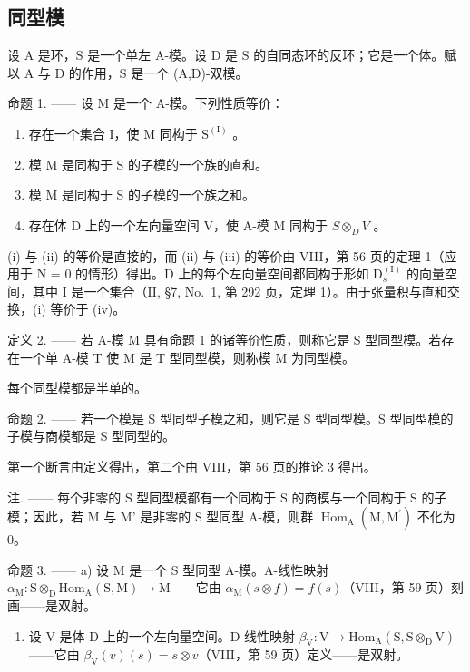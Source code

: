 \subsection{同型模}

设 A 是环，S 是一个单左 A-模。设 D 是 S 的自同态环的反环；它是一个体。赋以 A 与 D 的作用，S 是一个 (A,D)-双模。

命题 1. —— 设 M 是一个 A-模。下列性质等价：

\begin{enumerate}
\def\labelenumi{(\roman{enumi})}
\item
  存在一个集合 I，使 M 同构于 \(\mathrm{S}^{(\mathrm{I})}\) 。
\item
  模 M 是同构于 S 的子模的一个族的直和。
\item
  模 M 是同构于 S 的子模的一个族之和。
\item
  存在体 D 上的一个左向量空间 V，使 A-模 M 同构于 \(S \otimes_{D} V\) 。
\end{enumerate}

(i) 与 (ii) 的等价是直接的，而 (ii) 与 (iii) 的等价由 VIII，第 56 页的定理 1（应用于 N = 0 的情形）得出。D 上的每个左向量空间都同构于形如 \(\mathrm{D}_{s}^{(\mathrm{I})}\) 的向量空间，其中 I 是一个集合（II, §7, No.~1, 第 292 页，定理 1）。由于张量积与直和交换，(i) 等价于 (iv)。

定义 2. —— 若 A-模 M 具有命题 1 的诸等价性质，则称它是 S 型同型模。若存在一个单 A-模 T 使 M 是 T 型同型模，则称模 M 为同型模。

每个同型模都是半单的。

命题 2. —— 若一个模是 S 型同型子模之和，则它是 S 型同型模。S 型同型模的子模与商模都是 S 型同型的。

第一个断言由定义得出，第二个由 VIII，第 56 页的推论 3 得出。

注. —— 每个非零的 S 型同型模都有一个同构于 S 的商模与一个同构于 S 的子模；因此，若 M 与 M' 是非零的 S 型同型 A-模，则群 \(\operatorname{Hom}_{\mathrm{A}}(\mathrm{M},\mathrm{M}^{\prime})\) 不化为 0。

命题 3. —— a) 设 M 是一个 S 型同型 A-模。A-线性映射 \(\alpha_{\mathrm{M}}: \mathrm{S} \otimes_{\mathrm{D}} \mathrm{Hom}_{\mathrm{A}}(\mathrm{S}, \mathrm{M}) \to \mathrm{M}\)——它由 \(\alpha_{\mathrm{M}}(s \otimes f) = f(s)\)（VIII，第 59 页）刻画——是双射。

\begin{enumerate}
\def\labelenumi{\alph{enumi})}
\setcounter{enumi}{1}
\tightlist
\item
  设 V 是体 D 上的一个左向量空间。D-线性映射 \(\beta_{\mathrm{V}}: \mathrm{V} \to \mathrm{Hom}_{\mathrm{A}}(\mathrm{S}, \mathrm{S} \otimes_{\mathrm{D}} \mathrm{V})\)——它由 \(\beta_{\mathrm{V}}(v)(s) = s \otimes v\)（VIII，第 59 页）定义——是双射。
\end{enumerate}

